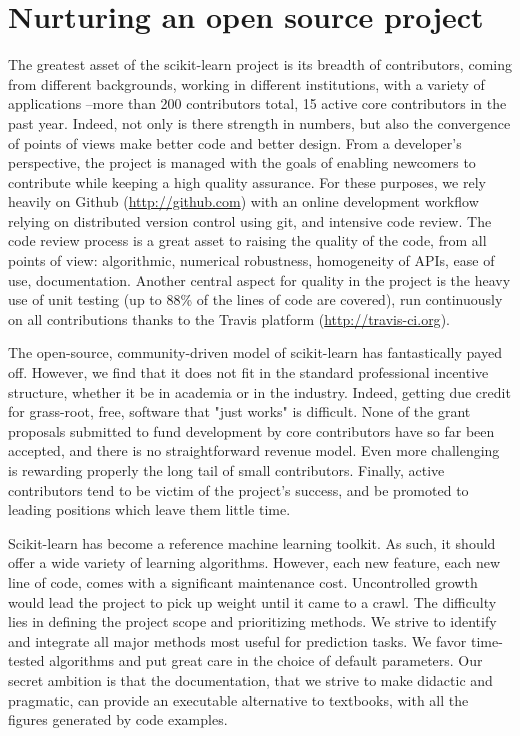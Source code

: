 \documentclass[a4paper]{article}
\begin{document}
\section{Nurturing an open source project}

The greatest asset of the scikit-learn project is its breadth of
contributors, coming from different backgrounds, working in different
institutions, with a variety of applications --more than 200 contributors
total, 15 active core contributors in the past year. Indeed, not only
is there strength in numbers, but also the convergence of points of views
make better code and better design. From a developer's perspective, the
project is managed with the goals of enabling newcomers to
contribute while keeping a high quality assurance. For these purposes, we
rely heavily on Github (\url{http://github.com}) with an online
development workflow relying on distributed version control using git,
and intensive code review. The code review process is a great asset to
raising the quality of the code, from all points of view: algorithmic,
numerical robustness, homogeneity of APIs, ease of use, documentation.
Another central aspect for quality in the project is the heavy use of
unit testing (up to 88\% of the lines of code are covered), run
continuously on all contributions thanks to the Travis platform
(\url{http://travis-ci.org}).

The open-source, community-driven model of scikit-learn has fantastically
payed off. However, we find that it does not fit in the standard
professional incentive structure, whether it be in academia or in the
industry. Indeed, getting due credit for grass-root, free, software that
"just works" is difficult. None of the grant proposals submitted to fund
development by core contributors have so far been accepted, and there is
no straightforward revenue model. Even more challenging is rewarding
properly the long tail of small contributors. Finally, active
contributors tend to be victim of the project's success, and be promoted
to leading positions which leave them little time.

Scikit-learn has become a reference machine learning toolkit. As such, it
should offer a wide variety of learning algorithms. However, each new
feature, each new line of code, comes with a significant maintenance cost.
Uncontrolled growth would lead the project to pick up weight until it
came to a crawl. The difficulty lies in defining the project scope and
prioritizing methods. We strive to identify and integrate all major
methods most useful for prediction tasks. We favor time-tested
algorithms and put great care in the choice of default parameters. Our
secret ambition is that the documentation, that we strive to make
didactic and pragmatic, can provide an executable alternative to
textbooks, with all the figures generated by code examples.




\end{document}
